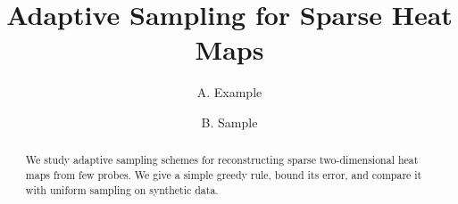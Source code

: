 \documentclass[11pt]{article}
\title{Adaptive Sampling for Sparse Heat Maps}
\author{A. Example \and B. Sample}
\date{}
\begin{document}
\maketitle

\begin{abstract}
We study adaptive sampling schemes for reconstructing sparse two-dimensional
heat maps from few probes. We give a simple greedy rule, bound its error, and
compare it with uniform sampling on synthetic data.
\end{abstract}









\end{document}
